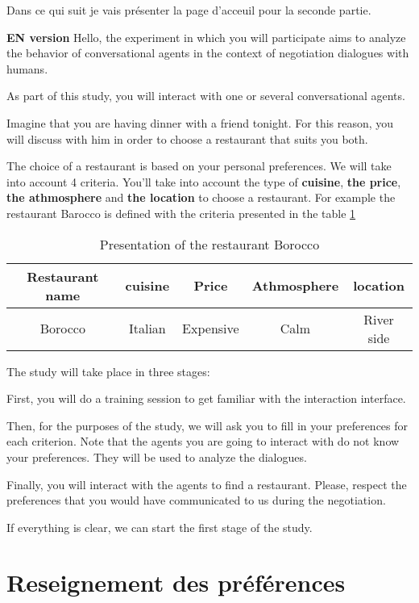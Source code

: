 \documentclass [french]{paper}
\begin{document}
		Dans ce qui suit je vais présenter la page d'acceuil pour la seconde partie.
		
		
		
		\textbf{EN version}
			Hello, the experiment in which you will participate aims to analyze the behavior of conversational agents in the context of negotiation dialogues with  humans.
			
			As part of this study, you will interact with one or several conversational agents.
			
			Imagine that you are having dinner with a friend tonight. For this reason, you will discuss with him in order to choose a restaurant that suits you both.
			
			The choice of a restaurant is based on your personal preferences. We will take into account 4 criteria. You'll take into account the type of \textbf {cuisine}, \textbf {the price}, \textbf {the athmosphere} and \textbf {the location} to choose a restaurant. For example the restaurant Barocco is defined with the criteria presented in the table \ref{teb:exEn}
			
				\begin{table}[h]
			\begin{tabular} {|c|c|c|c|c|}
				\hline
				Restaurant name & cuisine & Price & Athmosphere & location \\
				\hline
				Borocco & Italian & Expensive & Calm & River side \\
				\hline 
			\end{tabular}
			\label{teb:exEn}
			\caption{Presentation of the restaurant Borocco}
		\end{table}
		
		The study will take place in three stages:
		
		First, you will do a training session to get familiar with the interaction interface.
		
		Then, for the purposes of the study, we will ask you to fill in your preferences for each criterion.  Note that the agents you are going to interact with do not know your preferences. They will be used to analyze the dialogues.
		
		Finally, you will interact with the agents to find a restaurant. Please, respect the preferences that you would have communicated to us during the negotiation.
	
		If everything is clear, we can start the first stage of the study.
	
		\section{Reseignement des préférences}
\end{document}
